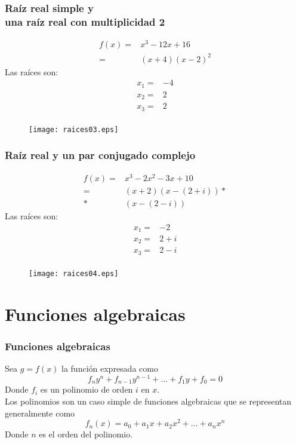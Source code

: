 \begin{frame}[fragile]
\frametitle{Raíz real simple y \\ una raíz real con multiplicidad 2}
\begin{minipage}{5cm}
\fontsize{12}{12}\selectfont
\[ \begin{split}
f(x)=& x^{3} - 12x + 16 \\
=& (x+4)(x-2)^{2}
\end{split} \]
Las raíces son:
\[ \begin{split}
x_{1} =& -4 \\
x_{2} =& 2 \\
x_{3} =& 2 \\
\end{split}\]
\end{minipage}
\hspace{0.5cm}
\begin{minipage}{4.5cm}
\begin{figure}
	\centering
	\texttt{[image: raices03.eps]} 
\end{figure}
\end{minipage}
\end{frame}
\begin{frame}[fragile]
\frametitle{Raíz real y un par conjugado complejo}
\begin{minipage}{5cm}
\fontsize{12}{12}\selectfont
\[ \begin{split}
f(x)=& x^{3} - 2x^{2}- 3x +10  \\
=& (x+2)(x- (2+i))* {}\\
*& (x-(2-i))
\end{split} \]
Las raíces son:
\[ \begin{split}
x_{1} =& -2 \\
x_{2} =& 2+i \\
x_{3} =& 2-i \\
\end{split}\]
\end{minipage}
\hspace{0.5cm}
\begin{minipage}{4.5cm}
\begin{figure}
	\centering
	\texttt{[image: raices04.eps]} 
\end{figure}
\end{minipage}
\end{frame}
\section{Funciones algebraicas}
\begin{frame}
\frametitle{Funciones algebraicas}
Sea $g=f(x)$ la función expresada como
\[ f_{n}y^{n} + f_{n-1}y^{n-1} + \ldots + f_{1}y + f_{0} = 0 \]
Donde $f_{i}$ es un polinomio de orden $i$ en $x$.
\\
\bigskip
Los polinomios son un caso simple de funciones algebraicas que se representan generalmente como
\[f_{n}(x) = a_{0} + a_{1}x + a_{2} x^{2}+ \ldots +a_{n}x^{n} \]
Donde $n$ es el orden del polinomio.
\end{frame}
